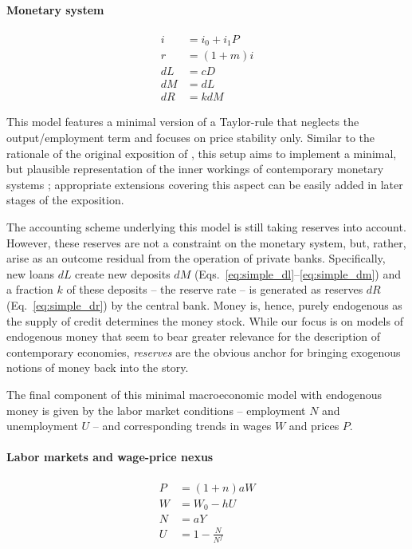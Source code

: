 \documentclass[12pt,a4paper]{article}
\begin{document}
\paragraph{Monetary system}
\begin{align}
  i &= i_0 + i_1 P \label{eq:simple_i} \\
  r &= (1 + m) i \label{eq:simple_r} \\
  dL &= cD \label{eq:simple_dl} \\
  dM &= dL \label{eq:simple_dm} \\
  dR &= k dM \label{eq:simple_dr}
\end{align}

This model features a minimal version of a Taylor-rule that neglects the output/employment term and focuses on price stability only. Similar to the rationale of the original exposition of \citet{fontanaSimpleTeachableMacroeconomic2009}, this setup aims to implement a minimal, but plausible representation of the inner workings of contemporary monetary systems \citep[e.g.][]{mcleayMoneyCreationModern2014}; appropriate extensions covering this aspect can be easily added in later stages of the exposition.


The accounting scheme underlying this model is still taking reserves into account. However, these reserves are not a constraint on the monetary system, but, rather, arise as an outcome residual from the operation of private banks. Specifically, new loans $dL$ create new deposits $dM$ (Eqs.~\ref{eq:simple_dl}--\ref{eq:simple_dm}) and a fraction $k$ of these deposits -- the reserve rate -- is generated as reserves $dR$ (Eq.~\ref{eq:simple_dr}) by the central bank. Money is, hence, purely endogenous as the supply of credit determines the money stock. While our focus is on models of endogenous money that seem to bear greater relevance for the description of contemporary economies, \textit{reserves} are the obvious anchor for bringing exogenous notions of money back into the story.

The final component of this minimal macroeconomic model with endogenous money is given by the labor market conditions -- employment $N$ and unemployment $U$ -- and corresponding trends in wages $W$ and prices $P$.

\paragraph{Labor markets and wage-price nexus}
\begin{align}
  P &= (1 + n) a W \label{eq:simple_p} \\
  W &= W_0 - h U \label{eq:simple_w} \\
  N &= a Y \label{eq:simple_n} \\
  U &= 1 - \frac{N}{N^f} \label{eq:simple_u}
\end{align}
\end{document}

